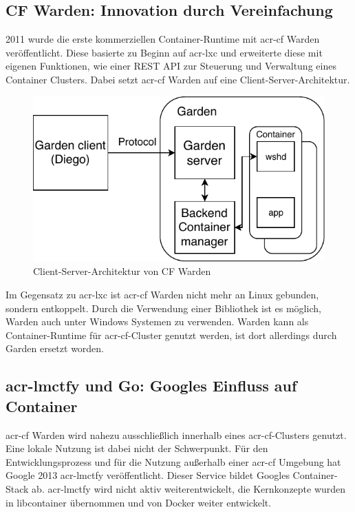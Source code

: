 \subsection{CF Warden: Innovation durch Vereinfachung}
\label{sec:geschichteCFWarden}
2011 wurde die erste kommerziellen Container-Runtime mit \gls{acr-cf} Warden veröffentlicht. Diese basierte zu Beginn auf \gls{acr-lxc} und erweiterte diese mit eigenen Funktionen, wie einer REST API zur Steuerung und Verwaltung eines Container Clusters. Dabei setzt \gls{acr-cf} Warden auf eine Client-Server-Architektur. 
\begin{figure}[h]
	\begin{center}
		\includegraphics{bilder/cf-warden-arch.pdf}
		\caption{Client-Server-Architektur von CF Warden \citep{CFGardenbackEndsContainerSecurityDebugging}}
		\label{fig:wardenArch}
	\end{center}
\end{figure}

Im Gegensatz zu \gls{acr-lxc} ist \gls{acr-cf} Warden nicht mehr an Linux gebunden, sondern entkoppelt. Durch die Verwendung einer Bibliothek ist es möglich, Warden auch unter Windows Systemen zu verwenden. Warden kann als Container-Runtime für \gls{acr-cf}-Cluster genutzt werden, ist dort allerdings durch Garden ersetzt worden.

\subsection{\gls{acr-lmctfy} und Go: Googles Einfluss auf Container}
\label{sec:geschichteLMCTFY}
\gls{acr-cf} Warden wird nahezu ausschließlich innerhalb eines \gls{acr-cf}-Clusters genutzt. Eine lokale Nutzung ist dabei nicht der Schwerpunkt. Für den Entwicklungsprozess und für die Nutzung außerhalb einer \gls{acr-cf} Umgebung hat Google 2013 \gls{acr-lmctfy} veröffentlicht. Dieser Service bildet Googles Container-Stack ab. \gls{acr-lmctfy} wird nicht aktiv weiterentwickelt, die Kernkonzepte wurden in libcontainer übernommen und von Docker weiter entwickelt.

